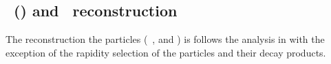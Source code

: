


\subsection{\lda\ (\alda) and \ks\ reconstruction}
\label{sec:V0Reco}

The reconstruction the \Vzero particles (\ks\, \lda, and \alda) is follows the analysis in \cite{Abelev:2013haa} with the exception of the rapidity selection of the particles and their decay products.


